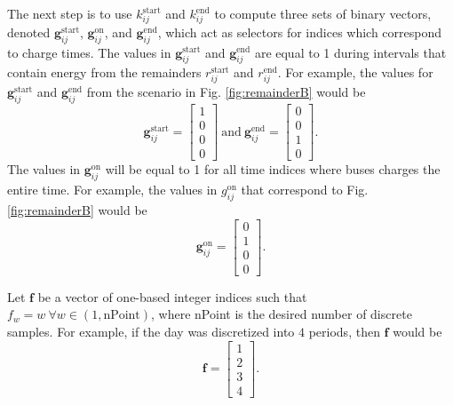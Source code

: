 The next step is to use $k_{ij}^{\text{start}}$ and $k_{ij}^{\text{end}}$ to compute three sets of binary vectors, denoted $\mathbf{g}^{\text{start}}_{ij}$, $\mathbf{g}^{\text{on}}_{ij}$, and $\mathbf{g}^{\text{end}}_{ij}$, which act as selectors for indices which correspond to charge times. The values in $\mathbf{g}_{ij}^{\text{start}}$ and $\mathbf{g}_{ij}^{\text{end}}$ are equal to 1 during intervals that contain energy from the remainders $r_{ij}^{\text{start}}$ and $r_{ij}^{\text{end}}$. For example, the values for $\mathbf{g}_{ij}^{\text{start}}$ and $\mathbf{g}_{ij}^{\text{end}}$ from the scenario in Fig. \ref{fig:remainderB} would be 
\begin{equation}
	\mathbf{g}_{ij}^{\text{start}} = \begin{bmatrix}1 \\ 0 \\ 0 \\ 0 \end{bmatrix} \ \text{and} \ \mathbf{g}_{ij}^{\text{end}} = \begin{bmatrix}0 \\ 0 \\ 1 \\ 0 \end{bmatrix}.
\end{equation}
The values in $\mathbf{g}_{ij}^{\text{on}}$ will be equal to 1 for all time indices where buses charges the entire time. For example, the values in $g_{ij}^{\text{on}}$ that correspond to Fig. \ref{fig:remainderB} would be 
\begin{equation}
	\mathbf{g}_{ij}^{\text{on}} = \begin{bmatrix}0 \\ 1 \\ 0 \\ 0 \end{bmatrix}.
\end{equation}
\par Let $\mathbf{f}$ be a vector of one-based integer indices such that $f_w = w \ \forall w \in (1,\text{nPoint})$, where nPoint is the desired number of discrete samples. For example, if the day was discretized into $4$ periods, then $\mathbf{f}$ would be 
\begin{equation}
	\mathbf{f} = \begin{bmatrix}1 \\ 2 \\ 3 \\ 4 \end{bmatrix}.
\end{equation}
